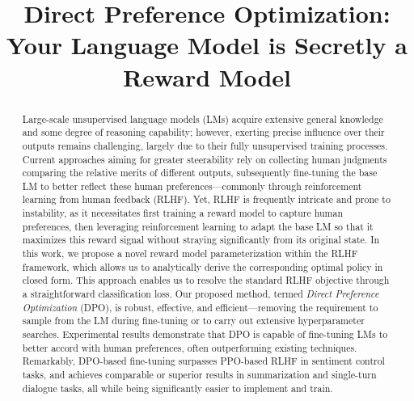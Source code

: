 \title{Direct Preference Optimization: Your Language Model is Secretly a Reward Model}

\begin{abstract}
Large-scale unsupervised language models (LMs) acquire extensive general knowledge and some degree of reasoning capability; however, exerting precise influence over their outputs remains challenging, largely due to their fully unsupervised training processes. Current approaches aiming for greater steerability rely on collecting human judgments comparing the relative merits of different outputs, subsequently fine-tuning the base LM to better reflect these human preferences—commonly through reinforcement learning from human feedback (RLHF). Yet, RLHF is frequently intricate and prone to instability, as it necessitates first training a reward model to capture human preferences, then leveraging reinforcement learning to adapt the base LM so that it maximizes this reward signal without straying significantly from its original state. In this work, we propose a novel reward model parameterization within the RLHF framework, which allows us to analytically derive the corresponding optimal policy in closed form. This approach enables us to resolve the standard RLHF objective through a straightforward classification loss. Our proposed method, termed \textit{Direct Preference Optimization} (DPO), is robust, effective, and efficient—removing the requirement to sample from the LM during fine-tuning or to carry out extensive hyperparameter searches. Experimental results demonstrate that DPO is capable of fine-tuning LMs to better accord with human preferences, often outperforming existing techniques. Remarkably, DPO-based fine-tuning surpasses PPO-based RLHF in sentiment control tasks, and achieves comparable or superior results in summarization and single-turn dialogue tasks, all while being significantly easier to implement and train.
\end{abstract}

